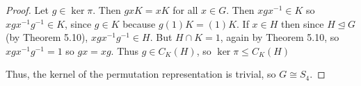 \documentclass[11pt, letterpaper]{article}
\begin{document}
\begin{enumerate}
\begin{enumerate}
\begin{proof}
      Let $g \in \operatorname{ker} \pi$. Then $gxK = xK$ for all $x \in G$. Then $xgx^{-1} \in K$ so $xgx^{-1}g^{-1} \in K$, since $g \in K$ because $g(1)K = (1)K$. If $x \in H$ then since $H \trianglelefteq G$ (by Theorem 5.10), $xgx^{-1}g^{-1} \in H$. But $H \cap K = 1$, again by Theorem 5.10, so $xgx^{-1}g^{-1} = 1$ so $gx = xg$. Thus $g \in C_K(H)$, so $\operatorname{ker} \pi \leq C_K(H)$

      Thus, the kernel of the permutation representation is trivial, so $G \cong S_4$.
    \end{proof}
  \end{enumerate} 
\end{enumerate}
\end{document}
